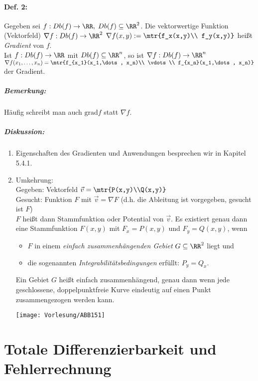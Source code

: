 \paragraph{Def. 2:} Gegeben sei $f:Db(f) \to \RR, \; Db(f) \subseteq \RR^2$. Die vektorwertige Funktion (Vektorfeld) $\nabla f: Db(f) \to \RR^2$ $\nabla f(x,y) := \mtr{f_x(x,y)\\ f_y(x,y)}$ heißt \emph{Gradient} von $f$.\\
Ist $f: Db(f) \to \RR$ mit $Db(f) \subseteq \RR^n$, so ist $\nabla f: Db(f)\to \RR^n$ $\nabla f(x_1,\dots, x_n)=\mtr{f_{x_1}(x_1,\dots, x_n)\\ \vdots \\ f_{x_n}(x_1,\dots, x_n)}$ der Gradient.

\subparagraph{Bemerkung:} Häufig schreibt man auch $\mathrm{grad}f$ statt $\nabla f$.

\subparagraph{Diskussion:}
\begin{enumerate}
\item Eigenschaften des Gradienten und Anwendungen besprechen wir in Kapitel 5.4.1.
\item Umkehrung: \\
Gegeben: Vektorfeld $\vec{v}=\mtr{P(x,y)\\Q(x,y)}$\\
Gesucht: Funktion $F$ mit $\vec{v}=\nabla F$ (d.h. die Ableitung ist vorgegeben, gesucht ist $F$)\\
$F$ heißt dann Stammfunktion oder Potential von $\vec{v}$. Es existiert genau dann eine Stammfunktion $F(x,y)$ mit $F_x=P(x,y)$ und $F_y=Q(x,y)$, wenn 
\begin{itemize}
\item $F$ in einem \emph{einfach zusammenhängenden Gebiet} $G \subseteq \RR^2$ liegt und
\item die sogenannten \emph{Integrabilitätsbedingungen} erfüllt: $P_y=Q_x$.
\end{itemize}
Ein Gebiet $G$ heißt einfach zusammenhängend, genau dann wenn jede geschlossene, doppelpunktfreie Kurve eindeutig auf einen Punkt zusammengezogen werden kann.
\begin{center}
\texttt{[image: Vorlesung/ABB151]}
\end{center}
\end{enumerate}

\section{Totale Differenzierbarkeit und Fehlerrechnung}
